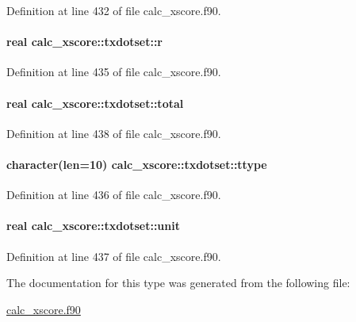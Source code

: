 Definition at line 432 of file calc\-\_\-xscore.\-f90.

\hypertarget{structcalc__xscore_1_1txdotset_ad4bb76a7eca398ff04daab81d3c829d5}{
\paragraph[{r}]{\setlength{\rightskip}{0pt plus 5cm}real calc\-\_\-xscore\-::txdotset\-::r}}\label{structcalc__xscore_1_1txdotset_ad4bb76a7eca398ff04daab81d3c829d5}


Definition at line 435 of file calc\-\_\-xscore.\-f90.

\hypertarget{structcalc__xscore_1_1txdotset_ac40f50b0fdaeb5202bba7b91b5a98f6b}{
\paragraph[{total}]{\setlength{\rightskip}{0pt plus 5cm}real calc\-\_\-xscore\-::txdotset\-::total}}\label{structcalc__xscore_1_1txdotset_ac40f50b0fdaeb5202bba7b91b5a98f6b}


Definition at line 438 of file calc\-\_\-xscore.\-f90.

\hypertarget{structcalc__xscore_1_1txdotset_a55b01224d1ac5029de545fcc81f8be39}{
\paragraph[{ttype}]{\setlength{\rightskip}{0pt plus 5cm}character(len=10) calc\-\_\-xscore\-::txdotset\-::ttype}}\label{structcalc__xscore_1_1txdotset_a55b01224d1ac5029de545fcc81f8be39}


Definition at line 436 of file calc\-\_\-xscore.\-f90.

\hypertarget{structcalc__xscore_1_1txdotset_a0c46438a3849ee4862425ed0f1578faf}{
\paragraph[{unit}]{\setlength{\rightskip}{0pt plus 5cm}real calc\-\_\-xscore\-::txdotset\-::unit}}\label{structcalc__xscore_1_1txdotset_a0c46438a3849ee4862425ed0f1578faf}


Definition at line 437 of file calc\-\_\-xscore.\-f90.



The documentation for this type was generated from the following file\-:\begin{DoxyCompactItemize}
\item 
\hyperlink{calc__xscore_8f90}{calc\-\_\-xscore.\-f90}\end{DoxyCompactItemize}
